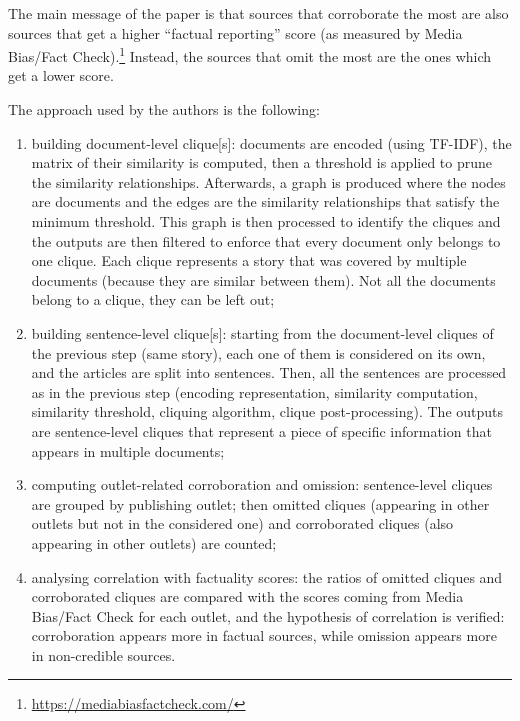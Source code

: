 The main message of the paper is that sources that \gls{corroborate} the most are also sources that get a higher ``factual reporting'' score (as measured by Media Bias/Fact Check).\footnote{\url{https://mediabiasfactcheck.com/}}
Instead, the sources that \gls{omit} the most are the ones which get a lower score.

The approach used by the authors is the following:
\begin{enumerate}
    \item building document-level \gls{clique}[s]: documents are encoded (using TF-IDF), the matrix of their similarity is computed, then a threshold is applied to prune the similarity relationships. Afterwards, a graph is produced where the nodes are documents and the edges are the similarity relationships that satisfy the minimum threshold. This graph is then processed to identify the cliques and the outputs are then filtered to enforce that every document only belongs to one clique. Each clique represents a story that was covered by multiple documents (because they are similar between them). Not all the documents belong to a clique, they can be left out;
    \item building sentence-level \gls{clique}[s]: starting from the document-level cliques of the previous step (same story), each one of them is considered on its own, and the articles are split into sentences. Then, all the sentences are processed as in the previous step (encoding representation, similarity computation, similarity threshold, cliquing algorithm, clique post-processing). The outputs are sentence-level cliques that represent a piece of specific information that appears in multiple documents; 
    \item computing outlet-related corroboration and omission: sentence-level cliques are grouped by publishing outlet; then omitted cliques (appearing in other outlets but not in the considered one) and corroborated cliques (also appearing in other outlets) are counted;
    \item analysing correlation with factuality scores: the ratios of omitted cliques and corroborated cliques are compared with the scores coming from Media Bias/Fact Check for each outlet, and the hypothesis of correlation is verified: corroboration appears more in factual sources, while omission appears more in non-credible sources.
\end{enumerate}

